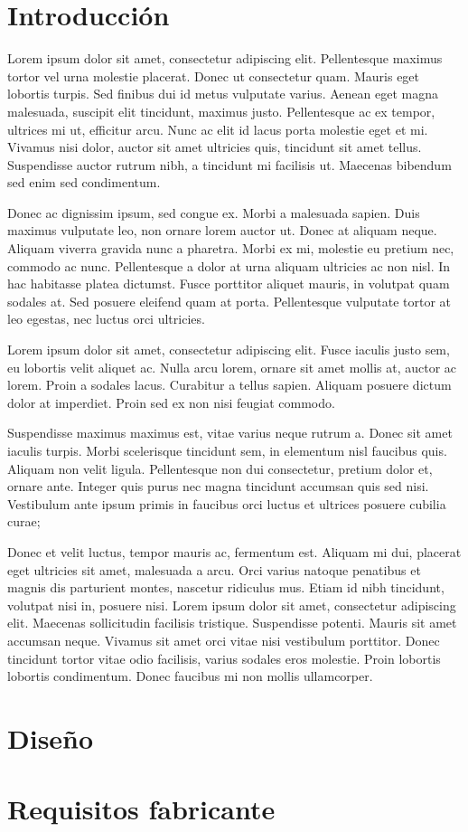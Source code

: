 \documentclass{reporti}
\begin{document}
\tableofcontents


\section{Introducción}
Lorem ipsum dolor sit amet, consectetur adipiscing elit. Pellentesque maximus tortor vel urna molestie placerat. Donec ut consectetur quam. Mauris eget lobortis turpis. Sed finibus dui id metus vulputate varius. Aenean eget magna malesuada, suscipit elit tincidunt, maximus justo. Pellentesque ac ex tempor, ultrices mi ut, efficitur arcu. Nunc ac elit id lacus porta molestie eget et mi. Vivamus nisi dolor, auctor sit amet ultricies quis, tincidunt sit amet tellus. Suspendisse auctor rutrum nibh, a tincidunt mi facilisis ut. Maecenas bibendum sed enim sed condimentum.

Donec ac dignissim ipsum, sed congue ex. Morbi a malesuada sapien. Duis maximus vulputate leo, non ornare lorem auctor ut. Donec at aliquam neque. Aliquam viverra gravida nunc a pharetra. Morbi ex mi, molestie eu pretium nec, commodo ac nunc. Pellentesque a dolor at urna aliquam ultricies ac non nisl. In hac habitasse platea dictumst. Fusce porttitor aliquet mauris, in volutpat quam sodales at. Sed posuere eleifend quam at porta. Pellentesque vulputate tortor at leo egestas, nec luctus orci ultricies.

Lorem ipsum dolor sit amet, consectetur adipiscing elit. Fusce iaculis justo sem, eu lobortis velit aliquet ac. Nulla arcu lorem, ornare sit amet mollis at, auctor ac lorem. Proin a sodales lacus. Curabitur a tellus sapien. Aliquam posuere dictum dolor at imperdiet. Proin sed ex non nisi feugiat commodo.

Suspendisse maximus maximus est, vitae varius neque rutrum a. Donec sit amet iaculis turpis. Morbi scelerisque tincidunt sem, in elementum nisl faucibus quis. Aliquam non velit ligula. Pellentesque non dui consectetur, pretium dolor et, ornare ante. Integer quis purus nec magna tincidunt accumsan quis sed nisi. Vestibulum ante ipsum primis in faucibus orci luctus et ultrices posuere cubilia curae;

Donec et velit luctus, tempor mauris ac, fermentum est. Aliquam mi dui, placerat eget ultricies sit amet, malesuada a arcu. Orci varius natoque penatibus et magnis dis parturient montes, nascetur ridiculus mus. Etiam id nibh tincidunt, volutpat nisi in, posuere nisi. Lorem ipsum dolor sit amet, consectetur adipiscing elit. Maecenas sollicitudin facilisis tristique. Suspendisse potenti. Mauris sit amet accumsan neque. Vivamus sit amet orci vitae nisi vestibulum porttitor. Donec tincidunt tortor vitae odio facilisis, varius sodales eros molestie. Proin lobortis lobortis condimentum. Donec faucibus mi non mollis ullamcorper.
\section{Diseño}
\section{Requisitos fabricante}
\end{document}
